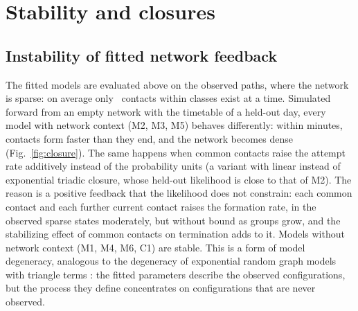 \section{Stability and closures}\label{sec:closure}

\subsection{Instability of fitted network feedback}
The fitted models are evaluated above on the observed paths, where the network is sparse: on average only \DataWithinContacts\ contacts within classes exist at a time.
Simulated forward from an empty network with the timetable of a held-out day, every model with network context (M2, M3, M5) behaves differently: within minutes, contacts form faster than they end, and the network becomes dense (Fig.~\ref{fig:closure}).
The same happens when common contacts raise the attempt rate additively instead of the probability units (a variant with linear instead of exponential triadic closure, whose held-out likelihood is close to that of M2).
The reason is a positive feedback that the likelihood does not constrain: each common contact and each further current contact raises the formation rate, in the observed sparse states moderately, but without bound as groups grow, and the stabilizing effect of common contacts on termination adds to it.
Models without network context (M1, M4, M6, C1) are stable.
This is a form of model degeneracy, analogous to the degeneracy of exponential random graph models with triangle terms \citep{schweinberger2011}: the fitted parameters describe the observed configurations, but the process they define concentrates on configurations that are never observed.

